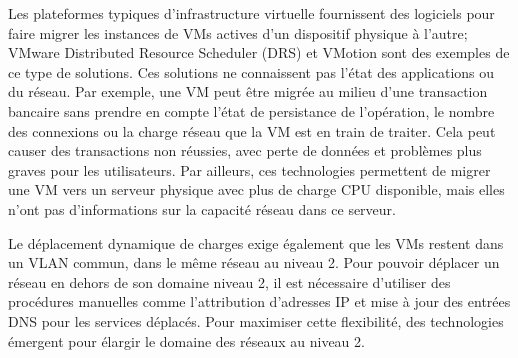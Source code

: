 Les plateformes typiques d'infrastructure virtuelle fournissent des logiciels pour faire migrer les instances de VMs actives d'un dispositif physique à l'autre; VMware Distributed Resource Scheduler (DRS) et VMotion sont des exemples de ce type de solutions. Ces solutions ne connaissent pas l'état des applications ou du réseau. Par exemple, une VM peut être migrée au milieu d'une transaction bancaire sans prendre en compte l'état de persistance de l'opération, le nombre des connexions ou la charge réseau que la VM est en train de traiter. Cela peut causer des transactions non réussies, avec perte de données et problèmes plus graves pour les utilisateurs. Par ailleurs, ces technologies permettent de migrer une VM vers un serveur physique avec plus de charge CPU disponible, mais elles n'ont pas d'informations sur la capacité réseau dans ce serveur.  



Le déplacement dynamique de charges exige également que les VMs restent dans un VLAN commun, dans le même réseau au niveau 2.  Pour pouvoir déplacer un réseau en dehors de son domaine niveau 2, il est nécessaire d'utiliser des procédures manuelles comme l'attribution d'adresses IP et mise à jour des entrées DNS pour les services déplacés. Pour maximiser cette flexibilité, des technologies émergent pour élargir le domaine des réseaux au niveau 2.

